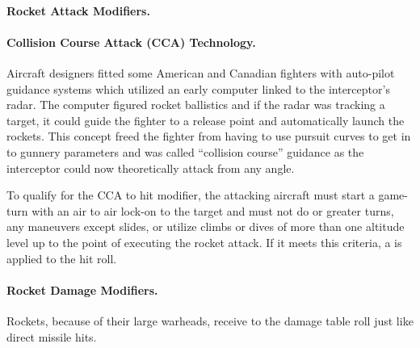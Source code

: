 \begin{advancedrules}
\paragraph{Rocket Attack Modifiers.} 

\paragraph{Collision Course Attack (CCA) Technology.} Aircraft designers fitted some American and Canadian fighters with auto-pilot guidance systems which utilized an early computer linked to the interceptor's radar. The computer figured rocket ballistics and if the radar was tracking a target, it could guide the fighter to a release point and automatically launch the rockets. This concept freed the fighter from having to use pursuit curves to get in to gunnery parameters and was called “collision course” guidance as the interceptor could now theoretically attack from any angle.

To qualify for the CCA to hit modifier, the attacking aircraft must start a game-turn with an air to air lock-on to the target and must not do  or greater turns, any maneuvers except slides, or utilize climbs or dives of more than one altitude level up to the point of executing the rocket attack. If it meets this criteria, a  is applied to the hit roll.

\paragraph{Rocket Damage Modifiers.} Rockets, because of their large warheads, receive  to the damage table roll just like direct missile hits.


\end{advancedrules}
